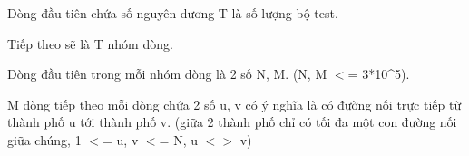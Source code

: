 Dòng đầu tiên chứa số nguyên dương T là số lượng bộ test.

Tiếp theo sẽ là T nhóm dòng.

Dòng đầu tiên trong mỗi nhóm dòng là 2 số N, M. (N, M $<$= 3*10\textasciicircum5).

M dòng tiếp theo mỗi dòng chứa 2 số u, v có ý nghĩa là có đường nối trực tiếp từ thành phố u tới thành phố v. (giữa 2 thành phố chỉ có tối đa một con đường nối giữa chúng, 1 $<$= u, v $<$= N, u $<$$>$ v)